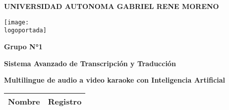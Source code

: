 \documentclass[a4paper]{article} %
\newcommand{\logoportada}{img/Escudo_FICCT.png}
\begin{document}

    \begin{titlepage}
        \centering
        \Large\textbf{UNIVERSIDAD AUTONOMA 
        GABRIEL RENE MORENO}\par\vspace{1.5cm}

        \centering
        \texttt{[image: \\logoportada]}\par\vspace{0.3cm}
        
        {\huge\bfseries\textcolor{titulocolor}{Grupo N°1}}\par\vspace{0.1cm}
        
        \begin{tcolorbox}[colback=red!5!white,colframe=red!75!black]
            \centering
            \Large \textbf{Sistema Avanzado de Transcripción y Traducción}\par
            \Large \textbf{Multilingue de audio a video karaoke con Inteligencia Artificial }\par
            
        \end{tcolorbox}\par\vspace{1cm}

 
        \begin{minipage}{0.79\textwidth} %
            \begin{flushleft}
                
                \begin{longtable}[c]{|l|c|}
                    \hline
                    \rowcolor{bleudefrance} \color{aliceblue}\textbf{Nombre} & \color{aliceblue}\textbf{Registro} \\
                    \hline
                    \endfirsthead
                    

\end{longtable}
\end{flushleft}
\end{minipage}
\end{titlepage}
\end{document}
